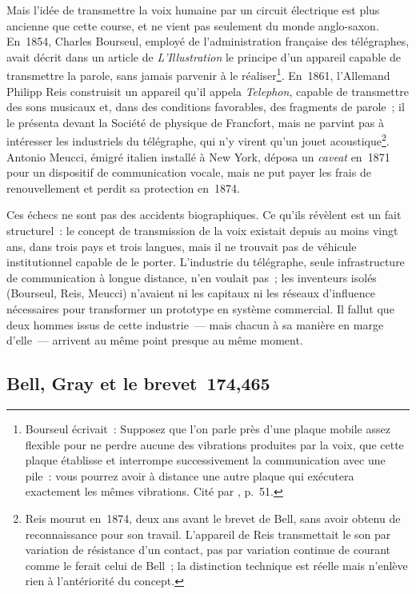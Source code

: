 Mais l'idée de transmettre la voix humaine par un circuit électrique est plus ancienne que cette course, et ne vient pas seulement du monde anglo-saxon. En~1854, Charles Bourseul, employé de l'administration française des télégraphes, avait décrit dans un article de \emph{L'Illustration} le principe d'un appareil capable de transmettre la parole, sans jamais parvenir à le réaliser\footnote{Bourseul écrivait~: \og Supposez que l'on parle près d'une plaque mobile assez flexible pour ne perdre aucune des vibrations produites par la voix, que cette plaque établisse et interrompe successivement la communication avec une pile~: vous pourrez avoir à distance une autre plaque qui exécutera exactement les mêmes vibrations.\fg{} Cité par \textcite{bertho_histoire_1984}, p.~51.}. En~1861, l'Allemand Philipp Reis construisit un appareil qu'il appela \emph{Telephon}, capable de transmettre des sons musicaux et, dans des conditions favorables, des fragments de parole~; il le présenta devant la Société de physique de Francfort, mais ne parvint pas à intéresser les industriels du télégraphe, qui n'y virent qu'un jouet acoustique\footnote{Reis mourut en~1874, deux ans avant le brevet de Bell, sans avoir obtenu de reconnaissance pour son travail. L'appareil de Reis transmettait le son par variation de résistance d'un contact, pas par variation continue de courant comme le ferait celui de Bell~; la distinction technique est réelle mais n'enlève rien à l'antériorité du concept.}. Antonio Meucci, émigré italien installé à New York, déposa un \emph{caveat} en~1871 pour un dispositif de communication vocale, mais ne put payer les frais de renouvellement et perdit sa protection en~1874.

%
Ces échecs ne sont pas des accidents biographiques. Ce qu'ils révèlent est un fait structurel~: le concept de transmission de la voix existait depuis au moins vingt ans, dans trois pays et trois langues, mais il ne trouvait pas de véhicule institutionnel capable de le porter. L'industrie du télégraphe, seule infrastructure de communication à longue distance, n'en voulait pas~; les inventeurs isolés (Bourseul, Reis, Meucci) n'avaient ni les capitaux ni les réseaux d'influence nécessaires pour transformer un prototype en système commercial. Il fallut que deux hommes issus de cette industrie~--- mais chacun à sa manière en marge d'elle~--- arrivent au même point presque au même moment.


\subsection{Bell, Gray et le brevet~174,465}\label{subsec:bell}

